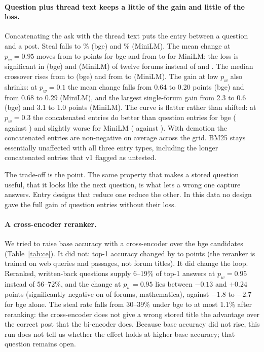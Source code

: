 \documentclass[11pt]{article}
\begin{document}
\paragraph{Question plus thread text keeps a little of the gain and little of the loss.} Concatenating the ask with the thread text puts the entry between a question and a post. Steal falls to \stealBgeAskdoc\% (bge) and \stealMiniAskdoc\% (MiniLM). The mean change at $p_w=0.95$ moves from \dNNBgeAsk{} to \dNNBgeAskdoc{} points for bge and from \dNNMiniAsk{} to \dNNMiniAskdoc{} for MiniLM; the loss is significant in \negBgeAskdoc{} (bge) and \negMiniAskdoc{} (MiniLM) of twelve forums instead of \negBgeAsk{} and \negMiniAsk{}. The median crossover rises from \medBgeAsk{} to \medBgeAskdoc{} (bge) and from \medMiniAsk{} to \medMiniAskdoc{} (MiniLM). The gain at low $p_w$ also shrinks: at $p_w=0.1$ the mean change falls from 0.64 to 0.20 points (bge) and from 0.68 to 0.29 (MiniLM), and the largest single-forum gain from 2.3 to 0.6 (bge) and 3.1 to 1.0 points (MiniLM). The curve is flatter rather than shifted: at $p_w=0.3$ the concatenated entries do better than question entries for bge (\dThBgeAskdoc{} against \dThBgeAsk) and slightly worse for MiniLM (\dThMiniAskdoc{} against \dThMiniAsk). With demotion the concatenated entries are non-negative on average across the grid. BM25 stays essentially unaffected with all three entry types, including the longer concatenated entries that v1 flagged as untested.

The trade-off is the point. The same property that makes a stored question useful, that it looks like the next question, is what lets a wrong one capture answers. Entry designs that reduce one reduce the other. In this data no design gave the full gain of question entries without their loss.

\paragraph{A cross-encoder reranker.} We tried to raise base accuracy with a cross-encoder over the bge candidates (Table~\ref{tab:ce}). It did not: top-1 accuracy changed by \ceGainMin{} to \ceGainMax{} points (the reranker is trained on web queries and passages, not forum titles). It did change the loop. Reranked, written-back questions supply 6--19\% of top-1 answers at $p_w=0.95$ instead of 56--72\%, and the change at $p_w=0.95$ lies between $-0.13$ and $+0.24$ points (significantly negative on \ceNeg{} of \ceN{} forums, mathematica), against $-1.8$ to $-2.7$ for bge alone. The steal rate falls from 30--39\% under bge to at most 1.1\% after reranking: the cross-encoder does not give a wrong stored title the advantage over the correct post that the bi-encoder does. Because base accuracy did not rise, this run does not tell us whether the effect holds at higher base accuracy; that question remains open.
\end{document}

